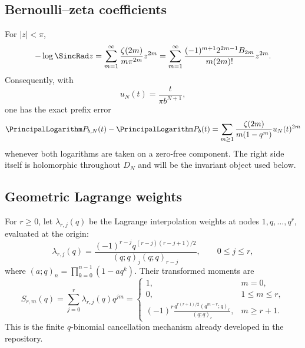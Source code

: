 \documentclass[11pt]{article}
\numberwithin{equation}{section}
\theoremstyle{definition}
\theoremstyle{remark}
\begin{document}
\subsection{Bernoulli--zeta coefficients}

For $|z|<\pi$,
\begin{equation}
 -\log\SincRad z
 =\sum_{m=1}^{\infty}\frac{\zeta(2m)}{m\pi^{2m}}z^{2m}
 =\sum_{m=1}^{\infty}
   \frac{(-1)^{m+1}2^{2m-1}B_{2m}}{m(2m)!}z^{2m}.
 \label{p3:eq:log-sinc}
\end{equation}
Consequently, with
\begin{equation}
 u_N(t)=\frac{t}{\pi b^{N+1}},
 \label{p3:eq:uN}
\end{equation}
one has the exact prefix error
\begin{equation}
 \PrincipalLogarithm P_{b,N}(t)-\PrincipalLogarithm P_b(t)
 =\sum_{m\ge1}\frac{\zeta(2m)}{m(1-q^m)}u_N(t)^{2m}
 \label{p3:eq:prefix-log-error}
\end{equation}
whenever both logarithms are taken on a zero-free component.  The right side itself is
holomorphic throughout $D_N$ and will be the invariant object used below.

\subsection{Geometric Lagrange weights}

For $r\ge0$, let $\lambda_{r,j}(q)$ be the Lagrange interpolation weights at nodes
$1,q,\ldots,q^r$, evaluated at the origin:
\begin{equation}
 \lambda_{r,j}(q)
 =\frac{(-1)^{r-j}q^{(r-j)(r-j+1)/2}}
       {(q;q)_j(q;q)_{r-j}},
 \qquad 0\le j\le r,
 \label{p3:eq:weights}
\end{equation}
where $(a;q)_n=\prod_{k=0}^{n-1}(1-aq^k)$.  Their transformed moments are
\begin{equation}
 S_{r,m}(q)=\sum_{j=0}^{r}\lambda_{r,j}(q)q^{jm}
 =\begin{cases}
 1,&m=0,\\
 0,&1\le m\le r,\\
 \displaystyle
 (-1)^r\frac{q^{r(r+1)/2}(q^{m-r};q)_r}{(q;q)_r},&m\ge r+1.
 \end{cases}
 \label{p3:eq:transformed-moments}
\end{equation}
This is the finite $q$-binomial cancellation mechanism already developed in the repository.
\end{document}
